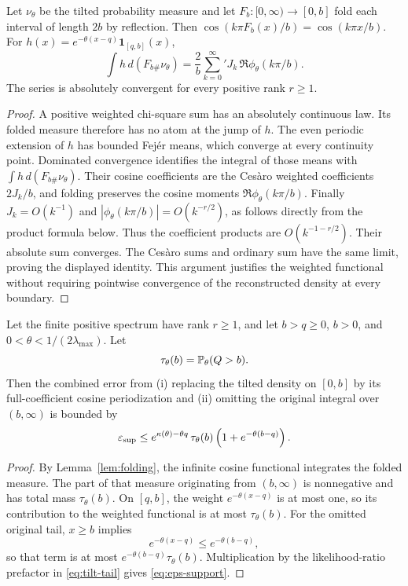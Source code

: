 \begin{lemma}
\label{lem:folding}
Let \(\nu_\theta\) be the tilted probability measure and let
\(F_b:[0,\infty)\to[0,b]\) fold each interval of length \(2b\) by
reflection.  Then
\(\cos(k\pi F_b(x)/b)=\cos(k\pi x/b)\).
For \(h(x)=e^{-\theta(x-q)}\mathbf1_{[q,b]}(x)\),
\[
\int h\,d(F_{b\#}\nu_\theta)
=\frac2b\sum_{k=0}^{\infty}{}'
J_k\,\Re\phi_\theta(k\pi/b).
\]
The series is absolutely convergent for every positive rank \(r\ge1\).
\end{lemma}
\begin{proof}
A positive weighted chi-square sum has an absolutely continuous law. Its
folded measure therefore has no atom at the jump of \(h\).  The even periodic
extension of \(h\) has bounded Fej\'er means, which converge at every continuity
point.  Dominated convergence identifies the integral of those means with
\(\int h\,d(F_{b\#}\nu_\theta)\).  Their cosine coefficients are the Ces\`aro
weighted coefficients \(2J_k/b\), and folding preserves the cosine moments
\(\Re\phi_\theta(k\pi/b)\).  Finally
\(J_k=O(k^{-1})\) and
\(|\phi_\theta(k\pi/b)|=O(k^{-r/2})\), as follows directly from the product
formula below.  Thus the coefficient products are
\(O(k^{-1-r/2})\). Their absolute sum converges.  The Ces\`aro sums and ordinary
sum have the same limit, proving the displayed identity.  This argument
justifies the weighted functional without requiring pointwise convergence of
the reconstructed density at every boundary.
\end{proof}

\begin{proposition}
\label{prop:support}
Let the finite positive spectrum have rank \(r\ge1\), and let
\(b>q\ge0\), \(b>0\), and \(0<\theta<1/(2\lambda_{\max})\).  Let
\[
\tau_{\theta}(b)=\mathbb P_{\theta}(Q>b).
\]
Then the combined error from (i) replacing the tilted density on $[0,b]$ by its full-coefficient cosine periodization and (ii) omitting the original integral over $(b,\infty)$ is bounded by
\begin{equation}
\varepsilon_{\mathrm{sup}}
\le
e^{\kappa(\theta)-\theta q}\,
\tau_{\theta}(b)
\left(1+e^{-\theta(b-q)}\right).
\label{eq:eps-support}
\end{equation}
\end{proposition}

\begin{proof}
By Lemma~\ref{lem:folding}, the infinite cosine functional integrates
the folded measure.  The part of that measure originating from \((b,\infty)\)
is nonnegative and has total mass $\tau_{\theta}(b)$. On $[q,b]$, the weight $e^{-\theta(x-q)}$ is at most one, so its contribution to the weighted functional is at most $\tau_{\theta}(b)$. For the omitted original tail, $x\ge b$ implies
\[
e^{-\theta(x-q)}\le e^{-\theta(b-q)},
\]
so that term is at most $e^{-\theta(b-q)}\tau_{\theta}(b)$. Multiplication by the likelihood-ratio prefactor in \eqref{eq:tilt-tail} gives \eqref{eq:eps-support}.
\end{proof}

